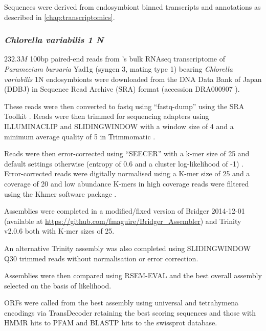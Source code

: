Sequences were derived from endosymbiont binned
transcripts and annotations as described in \ref{chap:transcriptomics}.




\subsubsection{\textit{Chlorella variabilis 1 N}}

\(232.3M\) 100bp paired-end reads from \citep{Kodama2014}'s 
bulk RNAseq transcriptome of \textit{Paramecium bursaria} Yad1g (syngen
3, mating type 1) bearing \textit{Chlorella variabilis} 1N endosymbionts
were downloaded from the DNA Data Bank of Japan (DDBJ) \citep{Tateno2002,Kaminuma2011}
in Sequence Read Archive (SRA) format \citep{Leinonen2011,KodamaNRA2012b} (accession DRA000907 \citep{Kodama2014}).

These reads were then converted to fastq using ``fastq-dump'' using the SRA Toolkit
\citep{NationalCenterforBiotechnologyInformation2011}.  Reads were then trimmed
for sequencing adapters using ILLUMINACLIP and SLIDINGWINDOW with a window size
of 4 and a minimum average quality of 5 in Trimmomatic \citep{Bolger2014a}.

Reads were then error-corrected using ``SEECER'' with a k-mer size of 25 and 
default settings otherwise (entropy of 0.6 and a cluster log-likelihood
of -1) \citep{Le2013}.  Error-corrected reads were digitally normalised
using a K-mer size of 25 and a coverage of 20 \citep{Brown2012} and 
low abundance K-mers in high coverage reads were filtered \citep{Zhang2014,Zhang2015}
using the Khmer software package \citep{Doring2008,Crusoe2015}.

Assemblies were completed in a modified/fixed version of 
Bridger 2014-12-01 \citep{Chang2015} (available at
\url{https://github.com/fmaguire/Bridger_Assembler}) and 
Trinity v2.0.6 \citep{Grabherr2011,Haas2013} both with K-mer
sizes of 25.

An alternative Trinity assembly was also completed using
SLIDINGWINDOW Q30 trimmed reads without normalisation or 
error correction.

Assemblies were then compared using RSEM-EVAL \citep{Li2014} and the best
overall assembly selected on the basis of likelihood.

ORFs were called from the best assembly using universal and tetrahymena encodings 
via TransDecoder \citep{Haas2013} retaining the best scoring sequences and those
with HMMR hits to PFAM and BLASTP hits to the swissprot database. 

